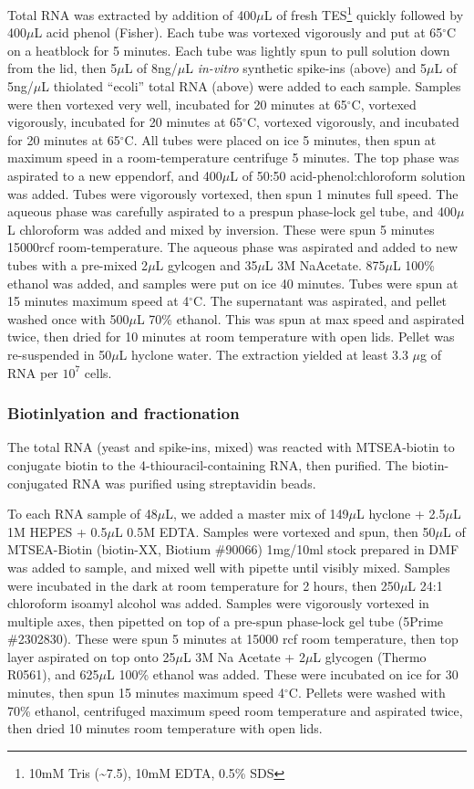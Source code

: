 {Total RNA was extracted by addition of 400\(\mu\)L of fresh
TES\footnote{10mM Tris (\textasciitilde{}7.5), 10mM EDTA, 0.5\% SDS}
quickly followed by 400\(\mu\)L acid phenol (Fisher). Each tube was
vortexed vigorously and put at 65\(^{\circ}\)C on a heatblock for 5
minutes. Each tube was lightly spun to pull solution down from the lid,
then 5\(\mu\)L of 8ng/\(\mu\)L \emph{in-vitro} synthetic spike-ins
(above) and 5\(\mu\)L of 5ng/\(\mu\)L thiolated ``ecoli'' total RNA
(above) were added to each sample. Samples were then vortexed very well,
incubated for 20 minutes at 65\(^{\circ}\)C, vortexed vigorously,
incubated for 20 minutes at 65\(^{\circ}\)C, vortexed vigorously, and
incubated for 20 minutes at 65\(^{\circ}\)C. All tubes were placed on
ice 5 minutes, then spun at maximum speed in a room-temperature
centrifuge 5 minutes. The top phase was aspirated to a new eppendorf,
and 400\(\mu\)L of 50:50 acid-phenol:chloroform solution was added.
Tubes were vigorously vortexed, then spun 1 minutes full speed. The
aqueous phase was carefully aspirated to a prespun phase-lock gel tube,
and 400\(\mu\)L chloroform was added and mixed by inversion. These were
spun 5 minutes 15000rcf room-temperature. The aqueous phase was
aspirated and added to new tubes with a pre-mixed 2\(\mu\)L gylcogen and
35\(\mu\)L 3M NaAcetate. 875\(\mu\)L 100\% ethanol was added, and
samples were put on ice 40 minutes. Tubes were spun at 15 minutes
maximum speed at 4\(^{\circ}\)C. The supernatant was aspirated, and
pellet washed once with 500\(\mu\)L 70\% ethanol. This was spun at max
speed and aspirated twice, then dried for 10 minutes at room temperature
with open lids. Pellet was re-suspended in 50\(\mu\)L hyclone water. The
extraction yielded at least 3.3 \(\mu\)g of RNA per \(10^7\) cells.

\subsubsection{Biotinlyation and fractionation}

The total RNA (yeast and spike-ins, mixed) was reacted with MTSEA-biotin
to conjugate biotin to the 4-thiouracil-containing RNA, then purified.
The biotin-conjugated RNA was purified using streptavidin beads.

To each RNA sample of 48\(\mu\)L, we added a master mix of 149\(\mu\)L
hyclone + 2.5\(\mu\)L 1M HEPES + 0.5\(\mu\)L 0.5M EDTA. Samples were
vortexed and spun, then 50\(\mu\)L of MTSEA-Biotin (biotin-XX, Biotium
\#90066) 1mg/10ml stock prepared in DMF was added to sample, and mixed
well with pipette until visibly mixed. Samples were incubated in the
dark at room temperature for 2 hours, then 250\(\mu\)L 24:1 chloroform
isoamyl alcohol was added. Samples were vigorously vortexed in multiple
axes, then pipetted on top of a pre-spun phase-lock gel tube (5Prime
\#2302830). These were spun 5 minutes at 15000 rcf room temperature,
then top layer aspirated on top onto 25\(\mu\)L 3M Na Acetate +
2\(\mu\)L glycogen (Thermo R0561), and 625\(\mu\)L 100\% ethanol was
added. These were incubated on ice for 30 minutes, then spun 15 minutes
maximum speed 4\(^{\circ}\)C. Pellets were washed with 70\% ethanol,
centrifuged maximum speed room temperature and aspirated twice, then
dried 10 minutes room temperature with open lids.

}
